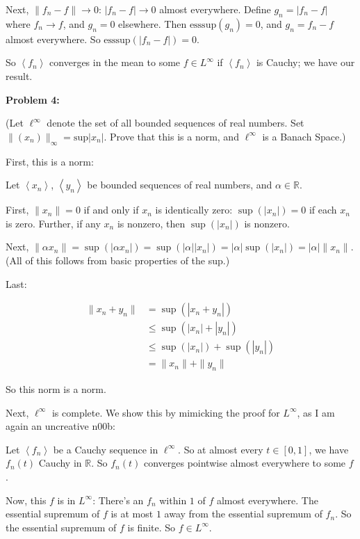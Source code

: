 \documentclass[a4paper,12pt]{article}
\newcommand{\tab}{\hspace{4mm}} %
\newcommand{\shunt}{\vspace{20mm}}
\newcommand{\absval}[1]{\left\lvert #1 \right\rvert}
\newcommand{\norm}[1]{\|#1\|}
\newcommand{\anbrack}[1]{\left\langle #1 \right\rangle}
\newcommand{\al}{\alpha} %
\newcommand{\R}{\mathbb{R}}
\begin{document}
\tab Next, $\norm{f_n - f} \to 0$: $\absval{f_n-f} \to 0$ almost everywhere. Define $g_n = \absval{f_n-f}$ where $f_n \to f$, and $g_n = 0$ elsewhere. Then $\text{esssup}(g_n)=0$, and $g_n = f_n-f$ almost everywhere. So $\text{esssup}(\absval{f_n-f})=0$.

\tab So $\anbrack{f_n}$ converges in the mean to some $f \in L^\infty$ if $\anbrack{f_n}$ is Cauchy; we have our result.

\shunt

{\bf Problem 4:} 

(Let $\ell^\infty$ denote the set of all bounded sequences of real numbers. Set $\norm{(x_n)}_\infty = \text{sup}\absval{x_n}$. Prove that this is a norm, and $\ell^\infty$ is a Banach Space.)

First, this is a norm:

Let $\anbrack{x_n}$, $\anbrack{y_n}$ be bounded sequences of real numbers, and $\al \in \R$.

\tab First, $\norm{x_n} = 0$ if and only if $x_n$ is identically zero: $\sup(\absval{x_n}) = 0$ if each $x_n$ is zero. Further, if any $x_n$ is nonzero, then $\sup(\absval{x_n})$ is nonzero.

\tab Next, $\norm{\al x_n} = \sup(\absval{\al x_n}) = \sup(\absval{\al}\absval{x_n}) = \absval{\al}\sup(\absval{x_n}) = \absval{\al}\norm{x_n}$. (All of this follows from basic properties of the sup.)

\tab Last:

\begin{align*}
\norm{x_n+y_n} &= \sup(\absval{x_n+y_n})\\
&\leq \sup(\absval{x_n}+\absval{y_n})\\
&\leq \sup(\absval{x_n})+\sup(\absval{y_n})\\
&=\norm{x_n}+\norm{y_n}
\end{align*}

So this norm is a norm.

Next, $\ell^\infty$ is complete. We show this by mimicking the proof for $L^\infty$, as I am again an uncreative n00b:


\tab Let $\anbrack{f_n}$ be a Cauchy sequence in $\ell^\infty$. So at almost every $t \in [0,1]$, we have $f_n(t)$ Cauchy in $\R$. So $f_n(t)$ converges pointwise almost everywhere to some $f$. %

\tab Now, this $f$ is in $L^\infty$: There's an $f_n$ within $1$ of $f$ almost everywhere. The essential supremum of $f$ is at most $1$ away from the essential supremum of $f_n$. So the essential supremum of $f$ is finite. So $f \in L^\infty$.
\end{document}
